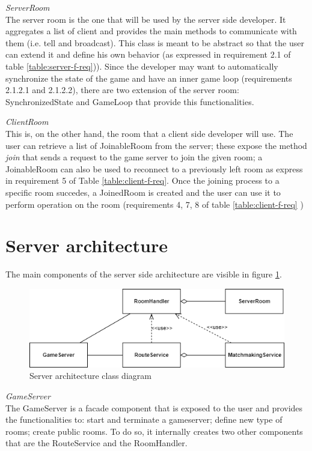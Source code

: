 \bigskip
\textit{ServerRoom}
\\
The server room is the one that will be used by the server side developer. It aggregates a list of client and provides the main methods to communicate with them (i.e. tell and broadcast).  This class is meant to be abstract so that the user can extend it and define his own behavior (as expressed in requirement 2.1 of table \ref{table:server-f-req})). Since the developer may want to automatically synchronize the state of the game and have an inner game loop (requirements 2.1.2.1 and 2.1.2.2), there are two extension of the server room: SynchronizedState and GameLoop that provide this functionalities.

\bigskip
\textit{ClientRoom}
\\
This is, on the other hand, the room that a client side developer will use. The user can retrieve a list of JoinableRoom from the server; these expose the method \textit{join} that sends a request to the game server to join the given room; a JoinableRoom can also be used to reconnect to a previously left room as express in requirement 5 of Table \ref{table:client-f-req}. Once the joining process to a specific room succedes, a JoinedRoom is created and the user can use it to perform operation on the room (requirements 4, 7, 8 of table \ref{table:client-f-req} ) 

\section{Server architecture}
The main components of the server side architecture are visible in figure \ref{fig:server_classes}. 

\begin{figure}[H]
	\includegraphics[scale=0.7]{images/3-architecture/server_architecture-classes.png}
	\caption{Server architecture class diagram}
	\label{fig:server_classes}
\end{figure}

\bigskip
\textit{GameServer}
\\
The GameServer is a facade component that is exposed to the user and provides the functionalities to: start and terminate a gameserver; define new type of rooms; create public rooms. To do so, it internally creates two other components that are the RouteService and the RoomHandler.

